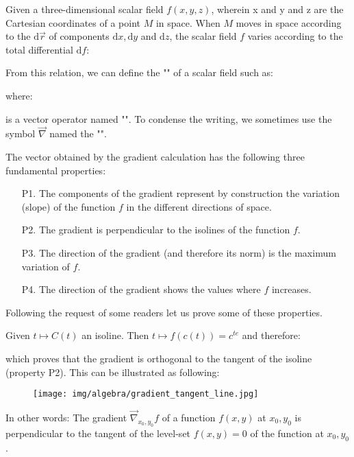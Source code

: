 	Given a three-dimensional scalar field $f(x,y,z)$, wherein x and y and z are the Cartesian coordinates of a point $M$ in space. When $M$ moves in space according to the $\mathrm{d}\vec{r}$ of components $\mathrm{d}x, \mathrm{d}y$ and $\mathrm{d}z$, the scalar field $f$ varies according to the total differential $\mathrm{d}f$:
	
	From this relation, we can define the "" of a scalar field such as:
	
	where:
	
	is a vector operator named "". To condense the writing, we sometimes use the symbol $\vec{\nabla}$ named the "".
	
	The vector obtained by the gradient calculation has the following three fundamental properties:
	\begin{enumerate}
		\item[P1.] The components of the gradient represent by construction the variation (slope) of the function $f$ in the different directions of space.
		
		\item[P2.] The gradient is perpendicular to the isolines of the function $f$.

		\item[P3.] The direction of the gradient (and therefore its norm) is the maximum variation of $f$.

		\item[P4.] The direction of the gradient shows the values where $f$ increases.
	\end{enumerate}
	\label{gradient normal}Following the request of some readers let us prove some of these properties.
	
	Given $t\mapsto C(t)$ an isoline. Then $t\mapsto f(c(t))=c^{te}$ and therefore:
	  
	which proves that the gradient is orthogonal to the tangent of the isoline (property P2). This can be illustrated as following:
	\begin{figure}[H]
		\centering
		\texttt{[image: img/algebra/gradient\_tangent\_line.jpg]}
	\end{figure}
	
	\begin{tcolorbox}[title=Remark,colframe=black,arc=10pt]
	In other words: The gradient $\vec{\nabla}_{x_{0}, y_{0}} f$ of a function $f(x, y)$ at $x_{0}, y_{0}$ is perpendicular to the tangent of the level-set $f(x, y)=0$ of the function at $x_{0}, y_{0}$.
	\end{tcolorbox}	
	
